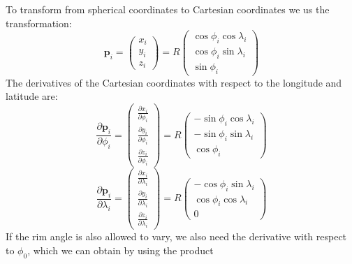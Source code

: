 \documentclass{article}
\renewcommand{\vec}[1]{\mathbf{#1}}
\begin{document}
To transform from spherical coordinates to Cartesian coordinates we us
the transformation:
\begin{equation}
  \vec{p}_i = 
  \label{retistruct-algorithm:eq:1}
  \left(
    \begin{array}{c}
    x_i\\ y_i\\ z_i
    \end{array}
  \right) =
  R\left(
    \begin{array}{c}
      \cos\phi_i\cos\lambda_i \\
      \cos\phi_i\sin\lambda_i\\
      \sin\phi_i 
    \end{array}\right)
\end{equation}
The derivatives of the Cartesian coordinates with respect to the
longitude and latitude are:
\begin{equation}
  \frac{\partial\vec{p}_i}{\partial\phi_i} = 
  \left(
    \begin{array}{c}
    \frac{\partial x_i}{\partial\phi_i}\\ \frac{\partial y_i}{\partial\phi_i}\\ \frac{\partial z_i}{\partial\phi_i}
    \end{array}
  \right) =
  R\left(
    \begin{array}{c}
      -\sin\phi_i\cos\lambda_i \\
      -\sin\phi_i\sin\lambda_i\\
      \cos\phi_i 
    \end{array}\right)
\end{equation}
\begin{equation}
  \frac{\partial\vec{p}_i}{\partial\lambda_i} = 
  \left(
    \begin{array}{c}
    \frac{\partial x_i}{\partial\lambda_i}\\ \frac{\partial y_i}{\partial\lambda_i}\\ \frac{\partial z_i}{\partial\lambda_i}
    \end{array}
  \right) =
  R\left(
    \begin{array}{c}
      -\cos\phi_i\sin\lambda_i \\
      \cos\phi_i\cos\lambda_i\\
      0
    \end{array}\right)
\end{equation}
If the rim angle is also allowed to vary, we also need the derivative
with respect to $\phi_0$, which we can obtain by using the product
\end{document}
